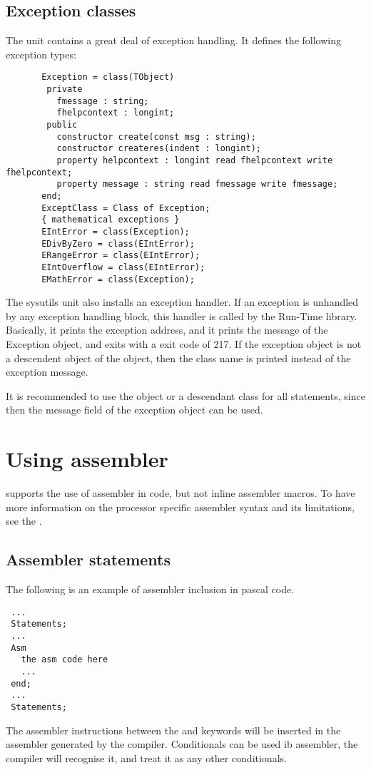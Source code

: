 \section{Exception classes}
\label{se:exceptclasses}
The  unit contains a great deal of exception handling.
It defines the following exception types:
\begin{verbatim}
       Exception = class(TObject)
        private
          fmessage : string;
          fhelpcontext : longint;
        public
          constructor create(const msg : string);
          constructor createres(indent : longint);
          property helpcontext : longint read fhelpcontext write fhelpcontext;
          property message : string read fmessage write fmessage;
       end;
       ExceptClass = Class of Exception;
       { mathematical exceptions }
       EIntError = class(Exception);
       EDivByZero = class(EIntError);
       ERangeError = class(EIntError);
       EIntOverflow = class(EIntError);
       EMathError = class(Exception);
\end{verbatim}
The sysutils unit also installs an exception handler. If an exception is
unhandled by any exception handling block, this handler is called by the
Run-Time library. Basically, it prints the exception address, and it prints
the message of the Exception object, and exits with a exit code of 217.
If the exception object is not a descendent object of the 
object, then the class name is printed instead of the exception message.

It is recommended to use the  object or a descendant class for
all  statements, since then the message field of the
exception object can be used.

\chapter{Using assembler}
\fpc supports the use of assembler in code, but not inline
assembler macros.  To have more information on the processor
specific assembler syntax and its limitations, see the \progref.

\section{Assembler statements }
The following is an example of assembler inclusion in pascal code.
\begin{verbatim}
 ...
 Statements;
 ...
 Asm
   the asm code here
   ...
 end;
 ...
 Statements;
\end{verbatim}
The assembler instructions between the  and  keywords will
be inserted in the assembler generated by the compiler.
Conditionals can be used ib assembler, the compiler will recognise it,
and treat it as any other conditionals.

